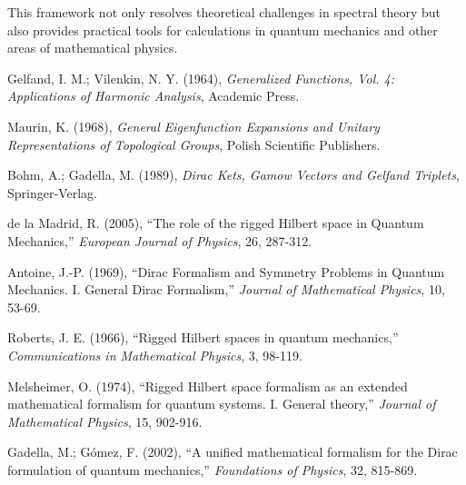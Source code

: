 \documentclass[12pt,a4paper]{article}
\theoremstyle{definition}
\begin{document}
This framework not only resolves theoretical challenges in spectral theory but also provides practical tools for calculations in quantum mechanics and other areas of mathematical physics.

\begin{thebibliography}{9}

Gelfand, I. M.; Vilenkin, N. Y. (1964), \textit{Generalized Functions, Vol. 4: Applications of Harmonic Analysis}, Academic Press.

Maurin, K. (1968), \textit{General Eigenfunction Expansions and Unitary Representations of Topological Groups}, Polish Scientific Publishers.

Bohm, A.; Gadella, M. (1989), \textit{Dirac Kets, Gamow Vectors and Gelfand Triplets}, Springer-Verlag.

de la Madrid, R. (2005), ``The role of the rigged Hilbert space in Quantum Mechanics,'' \textit{European Journal of Physics}, 26, 287-312.

Antoine, J.-P. (1969), ``Dirac Formalism and Symmetry Problems in Quantum Mechanics. I. General Dirac Formalism,'' \textit{Journal of Mathematical Physics}, 10, 53-69.

Roberts, J. E. (1966), ``Rigged Hilbert spaces in quantum mechanics,'' \textit{Communications in Mathematical Physics}, 3, 98-119.

Melsheimer, O. (1974), ``Rigged Hilbert space formalism as an extended mathematical formalism for quantum systems. I. General theory,'' \textit{Journal of Mathematical Physics}, 15, 902-916.

Gadella, M.; Gómez, F. (2002), ``A unified mathematical formalism for the Dirac formulation of quantum mechanics,'' \textit{Foundations of Physics}, 32, 815-869.

\end{thebibliography}
\end{document}
